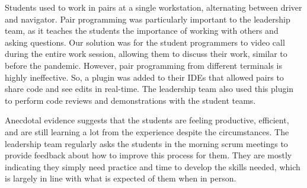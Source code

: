 Students used to work in pairs at a single workstation, alternating between driver and navigator. Pair programming was particularly important to the leadership team, as it teaches the students the importance of working with others and asking questions. Our solution was for the student programmers to video call during the entire work session, allowing them to discuss their work, similar to before the pandemic. However, pair programming from different terminals is highly ineffective. So, a plugin was added to their IDEs that allowed pairs to share code and see edits in real-time. The leadership team also used this plugin to perform code reviews and demonstrations with the student teams.

Anecdotal evidence suggests that the students are feeling productive, efficient, and are still learning a lot from the experience despite the circumstances. The leadership team regularly asks the students in the morning scrum meetings to provide feedback about how to improve this process for them. They are mostly indicating they simply need practice and time to develop the skills needed, which is largely in line with what is expected of them when in person.
